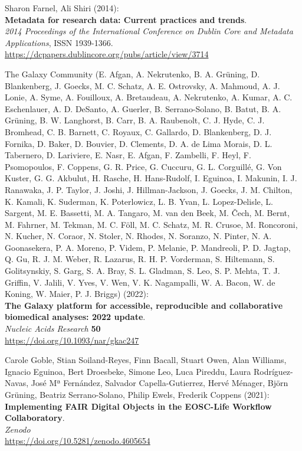 \begin{thebibliography}{9}
Sharon Farnel, Ali Shiri (2014):\\
\textbf{Metadata for research data: Current practices and trends}.\\
\emph{2014 Proceedings of the International Conference on Dublin Core
and Metadata Applications}, ISSN 1939-1366.\\
\url{https://dcpapers.dublincore.org/pubs/article/view/3714}

The Galaxy Community (E. Afgan, A. Nekrutenko, B. A.
Grüning, D. Blankenberg, J. Goecks, M. C. Schatz, A. E. Ostrovsky, A.
Mahmoud, A. J. Lonie, A. Syme, A. Fouilloux, A. Bretaudeau, A.
Nekrutenko, A. Kumar, A. C. Eschenlauer, A. D. DeSanto, A. Guerler, B.
Serrano-Solano, B. Batut, B. A. Grüning, B. W. Langhorst, B. Carr, B. A.
Raubenolt, C. J. Hyde, C. J. Bromhead, C. B. Barnett, C. Royaux, C.
Gallardo, D. Blankenberg, D. J. Fornika, D. Baker, D. Bouvier, D.
Clements, D. A. de Lima Morais, D. L. Tabernero, D. Lariviere, E. Nasr,
E. Afgan, F. Zambelli, F. Heyl, F. Psomopoulos, F. Coppens, G. R. Price,
G. Cuccuru, G. L. Corguillé, G. Von Kuster, G. G. Akbulut, H. Rasche, H.
Hans-Rudolf, I. Eguinoa, I. Makunin, I. J. Ranawaka, J. P. Taylor, J.
Joshi, J. Hillman-Jackson, J. Goecks, J. M. Chilton, K. Kamali, K.
Suderman, K. Poterlowicz, L. B. Yvan, L. Lopez-Delisle, L. Sargent, M.
E. Bassetti, M. A. Tangaro, M. van den Beek, M. Čech, M. Bernt, M.
Fahrner, M. Tekman, M. C. Föll, M. C. Schatz, M. R. Crusoe, M.
Roncoroni, N. Kucher, N. Coraor, N. Stoler, N. Rhodes, N. Soranzo, N.
Pinter, N. A. Goonasekera, P. A. Moreno, P. Videm, P. Melanie, P.
Mandreoli, P. D. Jagtap, Q. Gu, R. J. M. Weber, R. Lazarus, R. H. P.
Vorderman, S. Hiltemann, S. Golitsynskiy, S. Garg, S. A. Bray, S. L.
Gladman, S. Leo, S. P. Mehta, T. J. Griffin, V. Jalili, V. Yves, V. Wen,
V. K. Nagampalli, W. A. Bacon, W. de Koning, W. Maier, P. J. Briggs)
(2022):\\
\textbf{The Galaxy platform for accessible, reproducible and
collaborative biomedical analyses: 2022 update}.\\
\emph{Nucleic Acids Research} \textbf{50}\\
\url{https://doi.org/10.1093/nar/gkac247}

Carole Goble, Stian Soiland-Reyes, Finn Bacall, Stuart
Owen, Alan Williams, Ignacio Eguinoa, Bert Droesbeke, Simone Leo, Luca
Pireddu, Laura Rodríguez-Navas, José Mª Fernández, Salvador
Capella-Gutierrez, Hervé Ménager, Björn Grüning, Beatriz Serrano-Solano,
Philip Ewels, Frederik Coppens (2021):\\
\textbf{Implementing FAIR Digital Objects in the EOSC-Life Workflow
Collaboratory}.\\
\emph{Zenodo}\\
\url{https://doi.org/10.5281/zenodo.4605654}


\end{thebibliography}
